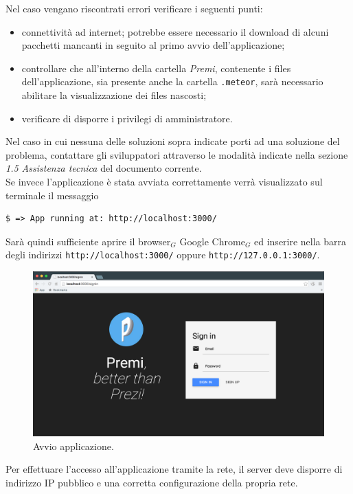 \newpage
Nel caso vengano riscontrati errori verificare i seguenti punti:
\begin{itemize}
\item connettività ad internet; potrebbe essere necessario il download di alcuni pacchetti mancanti in seguito al primo avvio dell'applicazione;
\item controllare che all'interno della cartella \emph{Premi}, contenente i files dell'applicazione, sia presente anche la cartella \verb+.meteor+, sarà necessario abilitare la visualizzazione dei files nascosti;
\item verificare di disporre i privilegi di amministratore.
\end{itemize}

\noindent Nel caso in cui nessuna delle soluzioni sopra indicate porti ad una soluzione del problema, contattare gli sviluppatori attraverso le modalità indicate nella sezione \emph{1.5 Assistenza tecnica} del documento corrente.\\

\noindent Se invece l'applicazione è stata avviata correttamente verrà visualizzato sul terminale il messaggio 

\begin{lstlisting}[style=DOS]
	$ => App running at: http://localhost:3000/
\end{lstlisting}

\noindent Sarà quindi sufficiente aprire il browser$_G$ Google Chrome$_G$ ed inserire nella barra degli indirizzi \verb+http://localhost:3000/+ oppure \verb+http://127.0.0.1:3000/+.

\begin{figure}[!h]
\begin{center}
\includegraphics[scale=0.3]{img/app_started.png}
\caption{Avvio applicazione.}
\end{center}
\end{figure}

\noindent Per effettuare l'accesso all'applicazione tramite la rete, il server deve disporre di indirizzo IP pubblico e una corretta configurazione della propria rete.